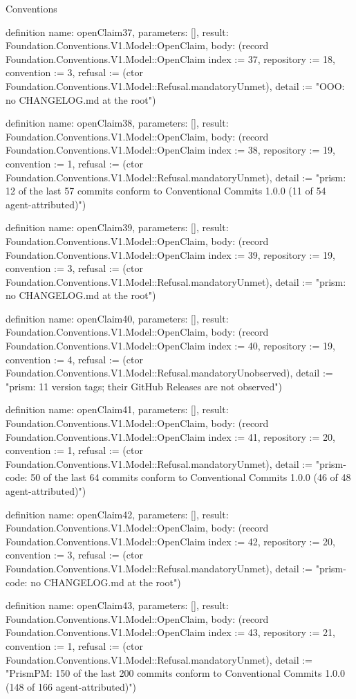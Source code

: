 \begin{lexlean}{Conventions}
\begin{semanticmodule}
definition{
  name: openClaim37,
  parameters: [],
  result: Foundation.Conventions.V1.Model::OpenClaim,
  body: (record Foundation.Conventions.V1.Model::OpenClaim {index := 37, repository := 18, convention := 3, refusal := (ctor Foundation.Conventions.V1.Model::Refusal.mandatoryUnmet), detail := "OOO: no CHANGELOG.md at the root"})
}

definition{
  name: openClaim38,
  parameters: [],
  result: Foundation.Conventions.V1.Model::OpenClaim,
  body: (record Foundation.Conventions.V1.Model::OpenClaim {index := 38, repository := 19, convention := 1, refusal := (ctor Foundation.Conventions.V1.Model::Refusal.mandatoryUnmet), detail := "prism: 12 of the last 57 commits conform to Conventional Commits 1.0.0 (11 of 54 agent-attributed)"})
}

definition{
  name: openClaim39,
  parameters: [],
  result: Foundation.Conventions.V1.Model::OpenClaim,
  body: (record Foundation.Conventions.V1.Model::OpenClaim {index := 39, repository := 19, convention := 3, refusal := (ctor Foundation.Conventions.V1.Model::Refusal.mandatoryUnmet), detail := "prism: no CHANGELOG.md at the root"})
}

definition{
  name: openClaim40,
  parameters: [],
  result: Foundation.Conventions.V1.Model::OpenClaim,
  body: (record Foundation.Conventions.V1.Model::OpenClaim {index := 40, repository := 19, convention := 4, refusal := (ctor Foundation.Conventions.V1.Model::Refusal.mandatoryUnobserved), detail := "prism: 11 version tags; their GitHub Releases are not observed"})
}

definition{
  name: openClaim41,
  parameters: [],
  result: Foundation.Conventions.V1.Model::OpenClaim,
  body: (record Foundation.Conventions.V1.Model::OpenClaim {index := 41, repository := 20, convention := 1, refusal := (ctor Foundation.Conventions.V1.Model::Refusal.mandatoryUnmet), detail := "prism-code: 50 of the last 64 commits conform to Conventional Commits 1.0.0 (46 of 48 agent-attributed)"})
}

definition{
  name: openClaim42,
  parameters: [],
  result: Foundation.Conventions.V1.Model::OpenClaim,
  body: (record Foundation.Conventions.V1.Model::OpenClaim {index := 42, repository := 20, convention := 3, refusal := (ctor Foundation.Conventions.V1.Model::Refusal.mandatoryUnmet), detail := "prism-code: no CHANGELOG.md at the root"})
}

definition{
  name: openClaim43,
  parameters: [],
  result: Foundation.Conventions.V1.Model::OpenClaim,
  body: (record Foundation.Conventions.V1.Model::OpenClaim {index := 43, repository := 21, convention := 1, refusal := (ctor Foundation.Conventions.V1.Model::Refusal.mandatoryUnmet), detail := "PrismPM: 150 of the last 200 commits conform to Conventional Commits 1.0.0 (148 of 166 agent-attributed)"})
}


\end{semanticmodule}
\end{lexlean}
